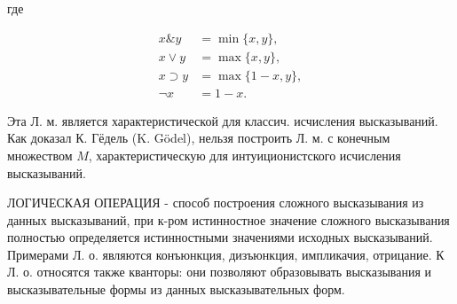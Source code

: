 \documentclass[10pt]{article}
\begin{document}
где



\[

\begin{aligned}

x \& y & =\min \{x, y\}, \\

x \vee y & =\max \{x, y\}, \\

x \supset y & =\max \{1-x, y\}, \\

\neg x & =1-x .

\end{aligned}

\]



Эта Л. м. является характеристической для классич. исчисления высказываний. Как доказал К. Гёдель (K. Gödel), нельзя построить Л. м. с конечным множеством $M$, характеристическую для интуиционистского исчисления высказываний.



ЛОГИЧЕСКАЯ ОПЕРАЦИЯ - способ построения сложного высказывания из данных высказываний, при к-ром истинностное значение сложного высказывания полностью определяется истинностными значениями исходных высказываний. Примерами Л. о. являются конъюнкция, дизъюнкция, импликачия, отрицание. К Л. о. относятся также кванторы: они позволяют образовывать высказывания и высказывательные формы из данных высказывательных форм.
\end{document}

